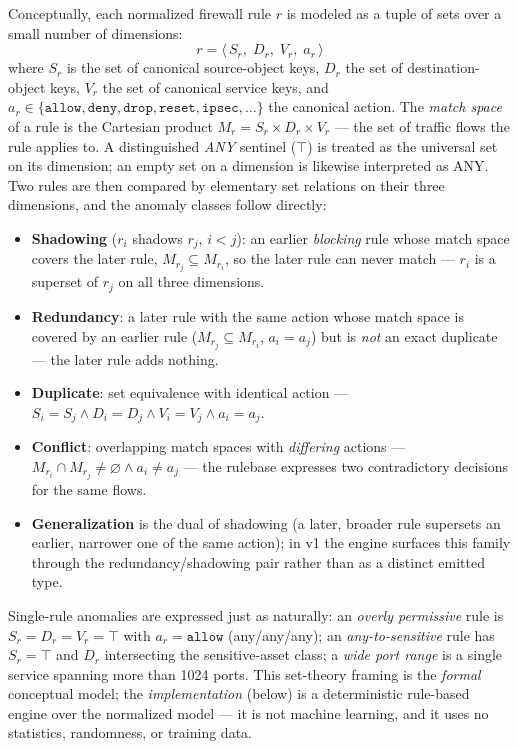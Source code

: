 \documentclass[12pt,a4paper]{report}
\renewcommand{\_}{\textunderscore\allowbreak}
\begin{document}
Conceptually, each normalized firewall rule $r$ is modeled as a tuple of sets over a small number of dimensions:
\[
r = \langle\, S_r,\; D_r,\; V_r,\; a_r \,\rangle
\]
where $S_r$ is the set of canonical source-object keys, $D_r$ the set of destination-object keys, $V_r$ the set of canonical service keys, and $a_r \in \{\texttt{allow},\texttt{deny},\texttt{drop},\texttt{reset},\texttt{ipsec},\dots\}$ the canonical action. The \emph{match space} of a rule is the Cartesian product $M_r = S_r \times D_r \times V_r$ --- the set of traffic flows the rule applies to. A distinguished \emph{ANY} sentinel ($\top$) is treated as the universal set on its dimension; an empty set on a dimension is likewise interpreted as ANY. Two rules are then compared by elementary set relations on their three dimensions, and the anomaly classes follow directly:

\begin{itemize}[leftmargin=1.4em]
  \item \textbf{Shadowing} ($r_i$ shadows $r_j$, $i<j$): an earlier \emph{blocking} rule whose match space covers the later rule, $M_{r_j} \subseteq M_{r_i}$, so the later rule can never match --- $r_i$ is a superset of $r_j$ on all three dimensions.
  \item \textbf{Redundancy}: a later rule with the same action whose match space is covered by an earlier rule ($M_{r_j} \subseteq M_{r_i}$, $a_i = a_j$) but is \emph{not} an exact duplicate --- the later rule adds nothing.
  \item \textbf{Duplicate}: set equivalence with identical action --- $S_i{=}S_j \wedge D_i{=}D_j \wedge V_i{=}V_j \wedge a_i{=}a_j$.
  \item \textbf{Conflict}: overlapping match spaces with \emph{differing} actions --- $M_{r_i} \cap M_{r_j} \neq \varnothing \wedge a_i \neq a_j$ --- the rulebase expresses two contradictory decisions for the same flows.
  \item \textbf{Generalization} is the dual of shadowing (a later, broader rule supersets an earlier, narrower one of the same action); in v1 the engine surfaces this family through the redundancy/shadowing pair rather than as a distinct emitted type.
\end{itemize}

Single-rule anomalies are expressed just as naturally: an \emph{overly permissive} rule is $S_r = D_r = V_r = \top$ with $a_r = \texttt{allow}$ (any/any/any); an \emph{any-to-sensitive} rule has $S_r = \top$ and $D_r$ intersecting the sensitive-asset class; a \emph{wide port range} is a single service spanning more than 1024 ports. This set-theory framing is the \emph{formal} conceptual model; the \emph{implementation} (below) is a deterministic rule-based engine over the normalized model --- it is not machine learning, and it uses no statistics, randomness, or training data.
\end{document}
